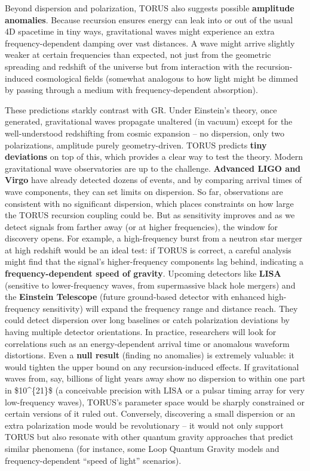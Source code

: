 \documentclass[]{article}
\begin{document}
Beyond dispersion and polarization, TORUS also suggests possible
\textbf{amplitude anomalies}. Because recursion ensures energy can leak
into or out of the usual 4D spacetime in tiny ways, gravitational waves
might experience an extra frequency-dependent damping over vast
distances​. A wave might arrive slightly weaker at certain frequencies
than expected, not just from the geometric spreading and redshift of the
universe but from interaction with the recursion-induced cosmological
fields (somewhat analogous to how light might be dimmed by passing
through a medium with frequency-dependent absorption).

These predictions starkly contrast with GR. Under Einstein's theory,
once generated, gravitational waves propagate unaltered (in vacuum)
except for the well-understood redshifting from cosmic expansion -- no
dispersion, only two polarizations, amplitude purely geometry-driven.
TORUS predicts \textbf{tiny deviations} on top of this, which provides a
clear way to test the theory. Modern gravitational wave observatories
are up to the challenge. \textbf{Advanced LIGO and Virgo} have already
detected dozens of events, and by comparing arrival times of wave
components, they can set limits on dispersion. So far, observations are
consistent with no significant dispersion, which places constraints on
how large the TORUS recursion coupling could be. But as sensitivity
improves and as we detect signals from farther away (or at higher
frequencies), the window for discovery opens. For example, a
high-frequency burst from a neutron star merger at high redshift would
be an ideal test: if TORUS is correct, a careful analysis might find
that the signal's higher-frequency components lag behind, indicating a
\textbf{frequency-dependent speed of gravity}​. Upcoming detectors like
\textbf{LISA} (sensitive to lower-frequency waves, from supermassive
black hole mergers) and the \textbf{Einstein Telescope} (future
ground-based detector with enhanced high-frequency sensitivity) will
expand the frequency range and distance reach. They could detect
dispersion over long baselines or catch polarization deviations by
having multiple detector orientations. In practice, researchers will
look for correlations such as an energy-dependent arrival time or
anomalous waveform distortions. Even a \textbf{null result} (finding no
anomalies) is extremely valuable: it would tighten the upper bound on
any recursion-induced effects. If gravitational waves from, say,
billions of light years away show no dispersion to within one part in
\$10\^{}\{21\}\$ (a conceivable precision with LISA or a pulsar timing
array for very low-frequency waves), TORUS's parameter space would be
sharply constrained or certain versions of it ruled out​. Conversely,
discovering a small dispersion or an extra polarization mode would be
revolutionary -- it would not only support TORUS but also resonate with
other quantum gravity approaches that predict similar phenomena (for
instance, some Loop Quantum Gravity models and frequency-dependent
``speed of light'' scenarios)​.
\end{document}
